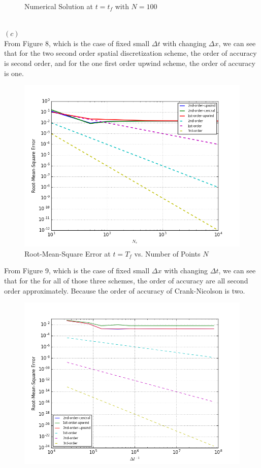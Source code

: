 \documentclass[12pt]{article}
\newenvironment{problem}[2][Problem]{\begin{trivlist}
\item[\hskip \labelsep {\bfseries #1}\hskip \labelsep {\bfseries #2.}]}{\end{trivlist}}
\begin{document}
\begin{problem}{2}
\begin{figure}[H]
 \caption{Numerical Solution at $t=t_f$ with $N=100$}
\label{label}
\end{figure}
\text{}\\
$(c)$ \\
From Figure 8, which is the case of fixed small $\Delta t$ with changing $\Delta x$, we can see that for the two second order spatial discretization scheme, the order of accuracy is second order, and for the one first order upwind scheme, the order of accuracy is one.\\
\begin{figure}[H]
\centering
  \includegraphics[scale=0.65]{p2c_fixed_dt.png}
 \caption{Root-Mean-Square Error at $t=T_f$ vs. Number of Points $N$}
\label{label}
\end{figure}
From Figure 9, which is the case of fixed small $\Delta x$ with changing $\Delta t$, we can see that for the for all of those three schemes, the order of accuracy are all second order approximately. Because the order of accuracy of Crank-Nicolson is two. \\
\begin{figure}[H]
\centering
  \includegraphics[scale=0.65]{p2c_fixed_dx.png}

\end{figure}
\end{problem}
\end{document}
